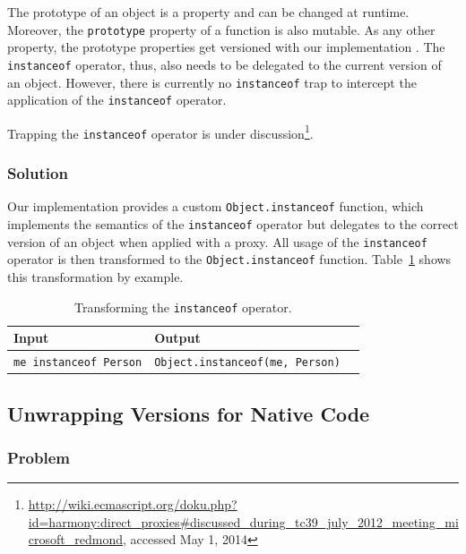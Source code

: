 The prototype of an object is a property and can be changed at runtime.
Moreover, the \lstinline{prototype} property of a function is also mutable.
As any other property, the prototype properties get versioned with our implementation .
The \lstinline{instanceof} operator, thus, also needs to be delegated to the current version of an object.
However, there is currently no \lstinline{instanceof} trap to intercept the application of the \lstinline{instanceof} operator.

Trapping the \lstinline{instanceof} operator is under discussion\footnote{\url{http://wiki.ecmascript.org/doku.php?id=harmony:direct_proxies\#discussed_during_tc39_july_2012_meeting_microsoft_redmond}, accessed May 1, 2014}.


\subsubsection{Solution}

Our implementation provides a custom \lstinline{Object.instanceof} function, which implements the semantics of the \lstinline{instanceof} operator but delegates to the correct version of an object when applied with a proxy.
All usage of the \lstinline{instanceof} operator is then transformed to the \lstinline{Object.instanceof} function.
Table~\ref{table:transformingInstanceof} shows this transformation by example.

\begin{table}[h]
\begin{center}
\begin{tabular}{| l | l | l |}
\hline
Input & Output \\ \hline
\lstinline|me instanceof Person| & \lstinline|Object.instanceof(me, Person)| \\ \hline
\end{tabular}
\end{center}
\caption[Table caption text]{Transforming the \lstinline{instanceof} operator.}
\label{table:transformingInstanceof}
\end{table}



\subsection{Unwrapping Versions for Native Code} \label{subsec:IMPLEMENTATION:4.3}


\subsubsection{Problem}

